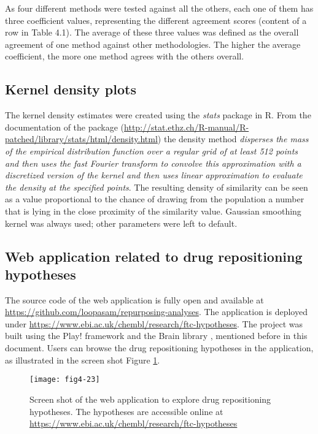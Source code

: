 As four different methods were tested against all the others, each one of them has three coefficient values, representing the different agreement scores (content of a row in Table 4.1). The average of these three values was defined as the overall agreement of one method against other methodologies. The higher the average coefficient, the more one method agrees with the others overall.

\subsection{Kernel density plots}
The kernel density estimates were created using the \emph{stats} package in R. From the documentation of the package (\url{http://stat.ethz.ch/R-manual/R-patched/library/stats/html/density.html}) the density method \emph{disperses the mass of the empirical distribution function over a regular grid of at least 512 points and then uses the fast Fourier transform to convolve this approximation with a discretized version of the kernel and then uses linear approximation to evaluate the density at the specified points}. The resulting density of similarity can be seen as a value proportional to the chance of drawing from the population a number that is lying in the close proximity of the similarity value. Gaussian smoothing kernel was always used; other parameters were left to default.

\subsection{Web application related to drug repositioning hypotheses}
The source code of the web application is fully open and available at \url{https://github.com/loopasam/repurposing-analyses}. The application is deployed under \url{https://www.ebi.ac.uk/chembl/research/ftc-hypotheses}. The project was built using the Play! framework and the Brain library \citep{croset2013brain}, mentioned before in this document. Users can browse the drug repositioning hypotheses in the application, as illustrated in the screen shot Figure \ref{fig4-23}.

\begin{figure}[ht]
    \centering
    \texttt{[image: fig4-23]}
    \caption{Screen shot of the web application to explore drug repositioning hypotheses. The hypotheses are accessible online at \url{https://www.ebi.ac.uk/chembl/research/ftc-hypotheses}}
    \label{fig4-23}
\end{figure}

